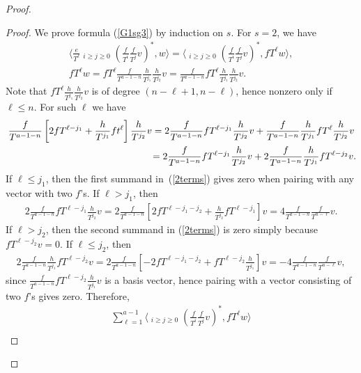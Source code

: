 \documentclass[pdftex]{sigma}
\numberwithin{equation}{section}
\begin{document}
\begin{proof}
\begin{proof}
We prove formula (\ref{G1sg3}) by induction on $s$. For $s=2$, we have
\begin{gather*}
\bigg\langle \frac{e}{T^{\ell}} \mathop{\sum_{i+j=a-1-\ell}}_{i\geq j\geq 0} \left(\frac{f}{T^i}\frac{f}{T^j}v\right)^*, w \bigg\rangle = \bigg\langle \mathop{\sum_{i+j=a-1-\ell}}_{i\geq j\geq 0} \left(\frac{f}{T^i}\frac{f}{T^j}v\right)^*, fT^{\ell} w \bigg\rangle, \\
 fT^{\ell} w = fT^{\ell} \frac{f}{T^{a-1-n}}\frac{h}{T^{j_1}} \frac{h}{T^{j_2}} v = \frac{f}{T^{a-1-n}} fT^{\ell} \frac{h}{T^{j_1}} \frac{h}{T^{j_2}} v.
\end{gather*}
Note that $fT^{\ell} \frac{h}{T^{j_1}} \frac{h}{T^{j_2}} v$ is of degree $(n-\ell+1, n-\ell)$, hence nonzero only if $\ell \leq n$. For such $\ell$ we have
\begin{gather}
\frac{f}{T^{a-1-n}} \left[ 2fT^{\ell-j_1} + \frac{h}{T^{j_1}} ft^{\ell} \right] \frac{h}{T^{j_2}} v = 2 \frac{f}{T^{a-1-n}} fT^{\ell-j_1} \frac{h}{T^{j_2}} v + \frac{f}{T^{a-1-n}} \frac{h}{T^{j_1}} fT^{\ell} \frac{h}{T^{j_2}} v \nonumber \\
\hphantom{\frac{f}{T^{a-1-n}} \left[ 2fT^{\ell-j_1} + \frac{h}{T^{j_1}} ft^{\ell} \right] \frac{h}{T^{j_2}} v} = 2 \frac{f}{T^{a-1-n}} fT^{\ell-j_1} \frac{h}{T^{j_2}} v +2 \frac{f}{T^{a-1-n}} \frac{h}{T^{j_1}} fT^{\ell-j_2} v. \label{2terms}
\end{gather}
If $\ell \leq j_1$, then the first summand in~(\ref{2terms}) gives zero when pairing with any vector with two $f$'s. If $\ell > j_1$, then
\begin{gather*}
2 \frac{f}{T^{a-1-n}} fT^{\ell-j_1} \frac{h}{T^{j_2}} v = 2 \frac{f}{T^{a-1-n}} \left[ 2fT^{\ell-j_1-j_2} + \frac{h}{T^{j_2}}fT^{\ell-j_1} \right] v = 4 \frac{f}{T^{a-1-n}} \frac{f}{T^{n-\ell}} v.
\end{gather*}
If $\ell > j_2$, then the second summand in (\ref{2terms}) is zero simply because $fT^{\ell-j_2} v = 0$. If $\ell \leq j_2$, then
\begin{gather*}
2 \frac{f}{T^{a-1-n}} \frac{h}{T^{j_1}} fT^{\ell-j_2} v = 2 \frac{f}{T^{a-1-n}} \left[ -2 fT^{\ell-j_1-j_2} + fT^{\ell-j_2}\frac{h}{T^{j_1}} \right] v = -4 \frac{f}{T^{a-1-n}} \frac{f}{T^{n-\ell}} v,
\end{gather*}
since $\frac{f}{T^{a-1-n}} fT^{\ell-j_2}\frac{h}{T^{j_1}}v$ is a basis vector, hence pairing with a vector consisting of two $f$'s gives zero. Therefore,
\begin{gather}
\sum_{\ell=1}^{a-1} \bigg\langle \mathop{\sum_{i+j=a-1-\ell}}_{i\geq j\geq 0} \left(\frac{f}{T^i}\frac{f}{T^j}v\right)^*, fT^{\ell} w \bigg\rangle \nonumber \\

\end{gather}
\end{proof}
\end{proof}
\end{document}
